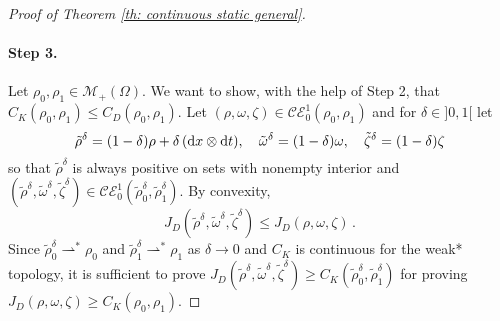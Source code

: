 \begin{proof}[Proof of Theorem \ref{th: continuous static general}]
\paragraph{Step 3.} 
Let $\rho_0, \rho_1 \in \mathcal{M}_+(\Omega)$. We want to show, with the help of Step 2, that $C_K(\rho_0, \rho_1) \leq C_D(\rho_0, \rho_1)$.
Let $(\rho,\omega,\zeta) \in \mathcal{CE}_0^1(\rho_0,\rho_1)$ and for $\delta \in ]0,1[$ let
\[
\tilde{\rho}^{\delta} = (1-\delta) \rho + \delta\, (\mathrm{d} x \otimes \mathrm{d} t), \quad \tilde{\omega}^{\delta} = (1-\delta) \omega, \quad \tilde{\zeta}^{\delta} = (1-\delta) \zeta
\]
so that $\tilde{\rho}^{\delta}$ is always positive on sets with nonempty interior and $(\tilde{\rho}^{\delta} ,  \tilde{\omega}^{\delta}, \tilde{\zeta}^{\delta} ) \in \mathcal{CE}_0^1(\tilde{\rho}_0^{\delta},\tilde{\rho}_1^{\delta})$. By convexity, 
\[
J_D(\tilde{\rho}^{\delta} ,  \tilde{\omega}^{\delta}, \tilde{\zeta}^{\delta} ) \leq J_D(\rho, \omega, \zeta)\, .
\]
Since $\tilde{\rho}_0^{\delta} \rightharpoonup^*\rho_0$ and $\tilde{\rho}_1^{\delta} \rightharpoonup^*\rho_1$ as $\delta \to 0$ and $C_K$ is continuous for the weak* topology, it is sufficient to prove
$
J_D(\tilde{\rho}^{\delta} ,  \tilde{\omega}^{\delta}, \tilde{\zeta}^{\delta} ) \geq C_K(\tilde{\rho}_0^{\delta} ,  \tilde{\rho}_1^{\delta} ) 
$
for proving $J_D(\rho, \omega, \zeta) \geq C_K(\rho_0,\rho_1)$.
%
%


\end{proof}
